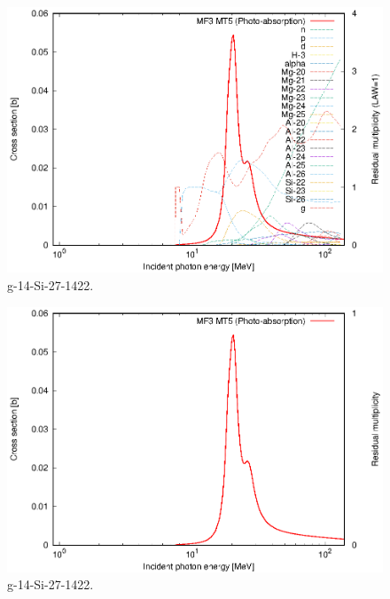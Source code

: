 \begin{figure}
 \includegraphics[width=\linewidth]{eps/g_14-Si-27_1422.eps}
  \caption{g-14-Si-27-1422.}
\end{figure}
\begin{figure}
 \includegraphics[width=\linewidth]{eps-law0/g_14-Si-27_1422.eps}
 \caption{g-14-Si-27-1422.}
\end{figure}
\newpage \clearpage

